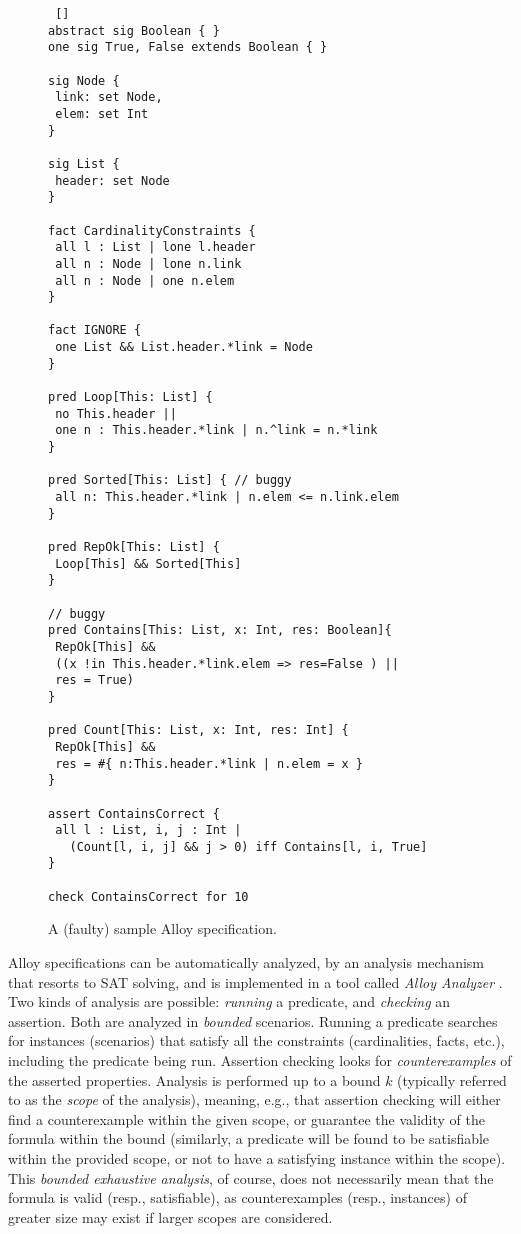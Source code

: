 \begin{figure}[ht!]
\begin{lstlisting} []
abstract sig Boolean { }
one sig True, False extends Boolean { }

sig Node {
 link: set Node,
 elem: set Int
}

sig List {
 header: set Node
}

fact CardinalityConstraints {
 all l : List | lone l.header
 all n : Node | lone n.link
 all n : Node | one n.elem
}

fact IGNORE {
 one List && List.header.*link = Node
}

pred Loop[This: List] {
 no This.header || 
 one n : This.header.*link | n.^link = n.*link 
}

pred Sorted[This: List] { // buggy
 all n: This.header.*link | n.elem <= n.link.elem 
}

pred RepOk[This: List] {
 Loop[This] && Sorted[This]
}

// buggy
pred Contains[This: List, x: Int, res: Boolean]{ 
 RepOk[This] &&
 ((x !in This.header.*link.elem => res=False ) || 
 res = True) 
}

pred Count[This: List, x: Int, res: Int] {
 RepOk[This] &&
 res = #{ n:This.header.*link | n.elem = x }
}

assert ContainsCorrect {
 all l : List, i, j : Int | 
   (Count[l, i, j] && j > 0) iff Contains[l, i, True]
}

check ContainsCorrect for 10
\end{lstlisting}
\caption{A (faulty) sample Alloy specification.}
\label{alloy-model}
\end{figure}

Alloy specifications can be automatically analyzed, by an analysis mechanism that resorts to SAT solving, and is implemented in a tool called \emph{Alloy Analyzer} \cite{Jackson2006}. Two kinds of analysis are possible: \emph{running} a predicate, and \emph{checking} an assertion. Both are analyzed in \emph{bounded} scenarios. Running a predicate searches for instances (scenarios) that satisfy all the constraints (cardinalities, facts, etc.), including the predicate being run. Assertion checking looks for \emph{counterexamples} of the asserted properties. Analysis is performed up to a bound $k$ (typically referred to as the \emph{scope} of the analysis), meaning, e.g., that assertion checking will either find a counterexample within the given scope, or guarantee the validity of the formula within the bound (similarly, a predicate will be found to be satisfiable within the provided scope, or not to have a satisfying instance within the scope). This \emph{bounded exhaustive analysis}, of course, does not necessarily mean that the formula is valid (resp., satisfiable), as counterexamples (resp., instances) of greater size may exist if larger scopes are considered.

